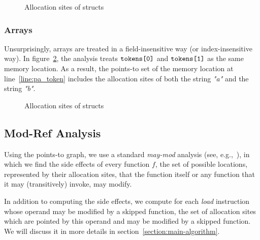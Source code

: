 \begin{figure}
  \captionsetup[subfloat]{labelformat=empty}
  \subfloat[]{
    
  }
  \caption{Allocation sites of structs}
  \label{fig:static-analysis-structs}
\end{figure}

\subsubsection{Arrays}
Unsurprisingly, arrays are treated in a field-insensitive way (or index-insensitive way).
In figure~\ref{fig:static-analysis-arrays},
the analysis treats $\texttt{tokens[0]}$ and $\texttt{tokens[1]}$ as the same memory location.
As a result, the points-to set of the memory location at line~\ref{line:pa_token}
includes the allocation sites of both the string \textit{"a"} and the string \textit{"b"}.

\begin{figure}
  \captionsetup[subfloat]{labelformat=empty}
  \subfloat[]{
    
  }
  \caption{Allocation sites of structs}
  \label{fig:static-analysis-arrays}
\end{figure}

\subsection{Mod-Ref Analysis}
Using the points-to graph, we use a standard \emph{may-mod} analysis (see, e.g.,~\cite{dragon-book}),
in which we find the side effects of every function $f$,
\ie the set of possible locations, represented by their allocation sites,
that the function itself or any function that it may (transitively) invoke, may modify.

In addition to computing the side effects,
we compute for each \textit{load} instruction whose operand may be modified by a skipped function,
the set of allocation sites which are pointed by this operand and may be modified by a skipped function.
We will discuss it in more details in section~\ref{section:main-algorithm}.


